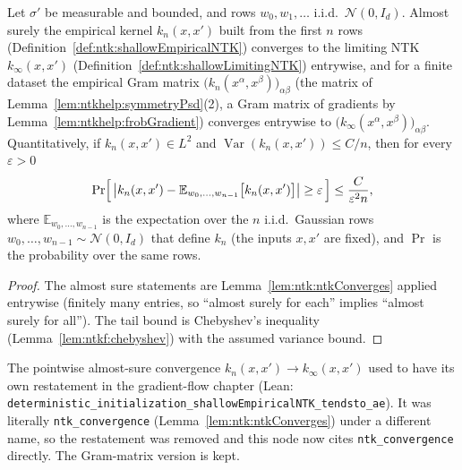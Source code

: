 \begin{theorem}\label{thm:ntkgf:deterministicInit}
  \leanok
Let $\sigma'$ be measurable and bounded, and rows $w_0,w_1,\dots$ i.i.d.\ $\mathcal N(0,I_d)$. Almost surely the empirical kernel $k_n(x,x')$ built from the first $n$ rows (Definition~\ref{def:ntk:shallowEmpiricalNTK}) converges to the limiting NTK $k_\infty(x,x')$ (Definition~\ref{def:ntk:shallowLimitingNTK}) entrywise, and for a finite dataset the empirical Gram matrix $\bigl(k_n(x^\alpha,x^\beta)\bigr)_{\alpha\beta}$ (the matrix of Lemma~\ref{lem:ntkhelp:symmetryPsd}(2), a Gram matrix of gradients by Lemma~\ref{lem:ntkhelp:frobGradient}) converges entrywise to $\bigl(k_\infty(x^\alpha,x^\beta)\bigr)_{\alpha\beta}$.
Quantitatively, if $k_n(x,x')\in L^2$ and $\operatorname{Var}(k_n(x,x'))\le C/n$, then for every $\varepsilon>0$
\[
  \Pr\Bigl[\,\bigl|k_n(x,x')-\mathbb E_{w_0,\dots,w_{n-1}}\bigl[k_n(x,x')\bigr]\bigr|\ge\varepsilon\,\Bigr]\le\frac{C}{\varepsilon^2n},
\]
where $\mathbb E_{w_0,\dots,w_{n-1}}$ is the expectation over the $n$ i.i.d.\ Gaussian rows $w_0,\dots,w_{n-1}\sim\mathcal N(0,I_d)$ that define $k_n$ (the inputs $x,x'$ are fixed), and $\Pr$ is the probability over the same rows.
\end{theorem}

\begin{proof}
  \leanok
The almost sure statements are Lemma~\ref{lem:ntk:ntkConverges} applied entrywise (finitely many entries, so ``almost surely for each'' implies ``almost surely for all''). The tail bound is Chebyshev's inequality
(Lemma~\ref{lem:ntkf:chebyshev}) with the assumed variance bound.
\end{proof}

\begin{remark}\label{rmk:ntkgf:deterministicInitChange}
The pointwise almost-sure convergence $k_n(x,x')\to k_\infty(x,x')$ used to have its own restatement in the gradient-flow chapter (Lean: \texttt{deterministic\_initialization\_shallowEmpiricalNTK\_tendsto\_ae}). It was literally \texttt{ntk\_convergence} (Lemma~\ref{lem:ntk:ntkConverges}) under a different name, so the restatement was removed and this node now cites \texttt{ntk\_convergence} directly. The Gram-matrix version is kept.
\end{remark}


